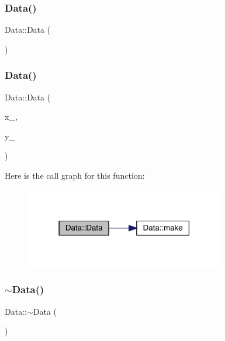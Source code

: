 \subsubsection{\texorpdfstring{Data()}{Data()}\hspace{0.1cm}{\footnotesize\ttfamily [4/6]}}
{\footnotesize\ttfamily Data\+::\+Data (\begin{DoxyParamCaption}{ }\end{DoxyParamCaption})\hspace{0.3cm}{\ttfamily [inline]}}

\mbox{\label{classData_a9f1ea96cc98b80ed3778ff5818cb91f8}} 
\subsubsection{\texorpdfstring{Data()}{Data()}\hspace{0.1cm}{\footnotesize\ttfamily [5/6]}}
{\footnotesize\ttfamily Data\+::\+Data (\begin{DoxyParamCaption}\item[{const vector$<$ \mbox{\hyperlink{classAbscissa}{Abscissa}} $\ast$ $>$ \&}]{x\+\_\+,  }\item[{const vector$<$ Ensem\+Real $>$ \&}]{y\+\_\+ }\end{DoxyParamCaption})\hspace{0.3cm}{\ttfamily [inline]}}

Here is the call graph for this function\+:
\nopagebreak
\begin{figure}[H]
\begin{center}
\leavevmode
\includegraphics[width=247pt]{d0/df3/classData_a9f1ea96cc98b80ed3778ff5818cb91f8_cgraph}
\end{center}
\end{figure}
\mbox{\label{classData_aab31956423290f0d62dcca47ab4d16dd}} 
\subsubsection{\texorpdfstring{$\sim$Data()}{~Data()}\hspace{0.1cm}{\footnotesize\ttfamily [2/2]}}
{\footnotesize\ttfamily Data\+::$\sim$\+Data (\begin{DoxyParamCaption}{ }\end{DoxyParamCaption})\hspace{0.3cm}{\ttfamily [inline]}}

